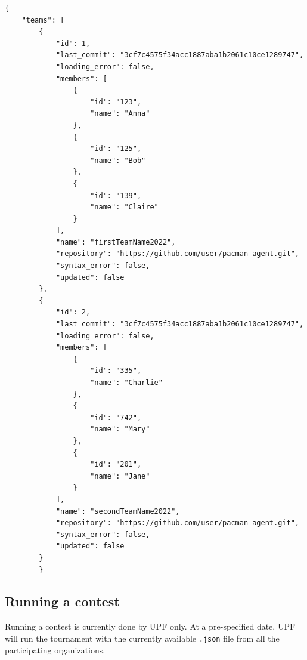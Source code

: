 \documentclass[11pt]{article}
\begin{document}

{\small
\begin{verbatim}
{
    "teams": [
        {
            "id": 1,
            "last_commit": "3cf7c4575f34acc1887aba1b2061c10ce1289747",
            "loading_error": false,
            "members": [
                {
                    "id": "123",
                    "name": "Anna"
                },
                {
                    "id": "125",
                    "name": "Bob"
                },
                {
                    "id": "139",
                    "name": "Claire"
                }
            ],
            "name": "firstTeamName2022",
            "repository": "https://github.com/user/pacman-agent.git",
            "syntax_error": false,
            "updated": false
        },
        {
            "id": 2,
            "last_commit": "3cf7c4575f34acc1887aba1b2061c10ce1289747",
            "loading_error": false,
            "members": [
                {
                    "id": "335",
                    "name": "Charlie"
                },
                {
                    "id": "742",
                    "name": "Mary"
                },
                {
                    "id": "201",
                    "name": "Jane"
                }
            ],
            "name": "secondTeamName2022",
            "repository": "https://github.com/user/pacman-agent.git",
            "syntax_error": false,
            "updated": false
        }
        }
\end{verbatim}
}

\subsection{Running a contest}
Running a contest is currently done by UPF only.
At a pre-specified date, UPF will run the tournament with the currently available
\texttt{.json} file from all the participating organizations.
\end{document}

